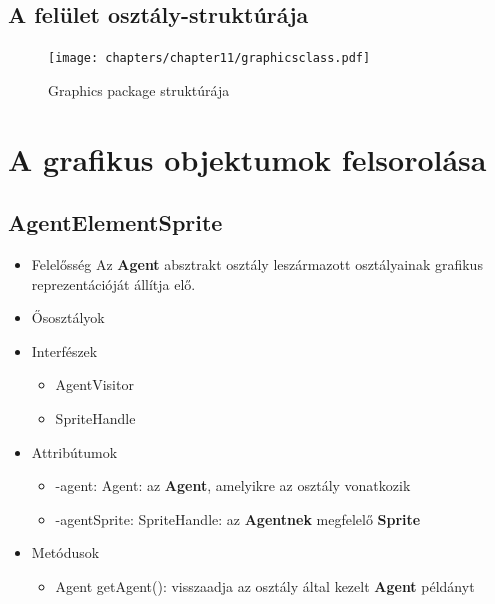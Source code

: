\clearpage

\subsection{A felület osztály-struktúrája}

\begin{figure}[h]
    \begin{center}
        \texttt{[image: chapters/chapter11/graphicsclass.pdf]}
        \caption{Graphics package struktúrája}
        \label{fig:graphicsclass}
    \end{center}
\end{figure}



\section{A grafikus objektumok felsorolása}

\subsection{AgentElementSprite}
\begin{itemize}
\item Felelősség \newline
    Az \textbf{Agent} absztrakt osztály leszármazott osztályainak grafikus reprezentációját állítja elő.
\item Ősosztályok
\item Interfészek
    \begin{itemize}
        \item AgentVisitor
        \item SpriteHandle
    \end{itemize}
\item Attribútumok
    \begin{itemize}
        \item -agent: Agent: az \textbf{Agent}, amelyikre az osztály vonatkozik
        \item -agentSprite: SpriteHandle: az \textbf{Agentnek} megfelelő \textbf{Sprite}
    \end{itemize}
\item Metódusok
	\begin{itemize}
        \item Agent getAgent(): visszaadja az osztály által kezelt \textbf{Agent} példányt
	\end{itemize}
\end{itemize}

